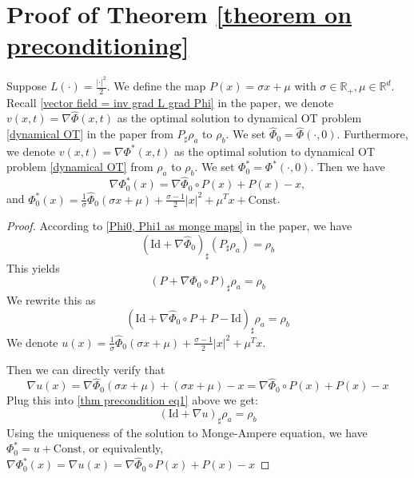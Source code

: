 \documentclass{article}
\newenvironment{customthm}[1]
  {\renewcommand\theinnercustomthm{#1}\innercustomthm}
  {\endinnercustomthm}
\begin{document}
\section{Proof of Theorem \ref{theorem on preconditioning}} \label{theorem3}


\begin{customthm}{3}
Suppose $L(\cdot)=\frac{|\cdot|^2}{2}$. We define the map $P(x)=\sigma x+\mu$ with $\sigma\in\mathbb{R}_+, \mu\in\mathbb{R}^d$. Recall \eqref{vector field = inv grad L grad Phi} in the paper, we denote ${v}(x,t)=\nabla\widehat{\Phi}(x, t)$ as the optimal solution to dynamical OT problem \eqref{dynamical OT} in the paper from $P_{\sharp}\rho_a$ to $\rho_b$. We set $\widehat{\Phi}_0 = \widehat{\Phi}(\cdot, 0)$. Furthermore, we denote ${v}(x,t)=\nabla\Phi^*(x,t)$ as the optimal solution to dynamical OT problem \eqref{dynamical OT} from $\rho_a$ to $\rho_b$. We set $\Phi^*_0=\Phi^*(\cdot, 0)$. Then we have
\begin{equation*}
  \nabla\Phi^*_0(x) = \nabla\widehat{\Phi}_0\circ P(x)+P(x)-x,
\end{equation*}
and $\Phi^*_0(x) = \frac{1}{\sigma}\widehat{\Phi}_0(\sigma x + \mu)+\frac{\sigma - 1}{2}|x|^2 + \mu^Tx+\textrm{Const}$.
\end{customthm}



\begin{proof}
 According to \eqref{Phi0, Phi1 as monge maps} in the paper, we have
 \begin{equation*}
   (\textrm{Id}+\nabla\widehat{\Phi}_0)_{\sharp}(P_{\sharp}\rho_a) = \rho_b
 \end{equation*}
 This yields
 \begin{equation*}
    (P+\nabla\Phi_0\circ P)_{\sharp}\rho_a = \rho_b
 \end{equation*}
 We rewrite this as
 \begin{equation}
    (\textrm{Id} + \nabla\widehat{\Phi}_0\circ P + P - \textrm{Id})_{\sharp}\rho_a = \rho_b  \label{thm precondition eq1}
 \end{equation}
 We denote $u(x) =  \frac{1}{\sigma}\widehat{\Phi}_0(\sigma x + \mu) + \frac{\sigma-1}{2}|x|^2 + \mu^Tx$.
 
 Then we can directly verify that
 \begin{equation*}
    \nabla u(x) = \nabla\widehat{\Phi}_0(\sigma x + \mu) + (\sigma x + \mu) - x = \nabla\widehat{\Phi}_0\circ P(x) + P(x) - x
 \end{equation*}
 Plug this into \eqref{thm precondition eq1} above we get:
 \begin{equation*}
    (\textrm{Id}+\nabla u)_{\sharp}\rho_a = \rho_b
 \end{equation*}
 Using the uniqueness of the solution to Monge-Ampere equation, we have $\Phi^*_0 = u +\textrm{Const}$, or equivalently, $\nabla\Phi^*_0(x) = \nabla u(x) = \nabla\widehat{\Phi}_0\circ P(x) + P(x)-x$
\end{proof}
\end{document}
